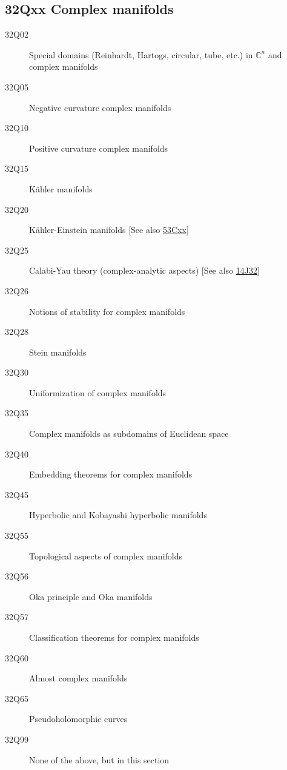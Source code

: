\subsection*{32Qxx  Complex manifolds }\label{32Qxx}
\begin{description} 
\item [32Q02]\label{32Q02} Special domains (Reinhardt, Hartogs, circular, tube, etc.) in $\mathbb{C}^n$ and complex manifolds
\item [32Q05]\label{32Q05} Negative curvature complex manifolds
\item [32Q10]\label{32Q10} Positive curvature complex manifolds
\item [32Q15]\label{32Q15} K\"{a}hler manifolds
\item [32Q20]\label{32Q20} K\"{a}hler-Einstein manifolds [See also \hyperref[53Cxx]{53Cxx}]
\item [32Q25]\label{32Q25} Calabi-Yau theory (complex-analytic aspects) [See also \hyperref[14J32]{14J32}]
\item [32Q26]\label{32Q26} Notions of stability for complex manifolds
\item [32Q28]\label{32Q28} Stein manifolds
\item [32Q30]\label{32Q30} Uniformization of complex manifolds 
\item [32Q35]\label{32Q35} Complex manifolds as subdomains of Euclidean space
\item [32Q40]\label{32Q40} Embedding theorems  for complex manifolds
\item [32Q45]\label{32Q45} Hyperbolic and Kobayashi hyperbolic manifolds
\item [32Q55]\label{32Q55} Topological aspects of complex manifolds
\item [32Q56]\label{32Q56} Oka principle and Oka manifolds
\item [32Q57]\label{32Q57} Classification theorems for complex manifolds
\item [32Q60]\label{32Q60} Almost complex manifolds
\item [32Q65]\label{32Q65} Pseudoholomorphic curves
\item [32Q99]\label{32Q99} None of the above, but in this section
\end{description}
